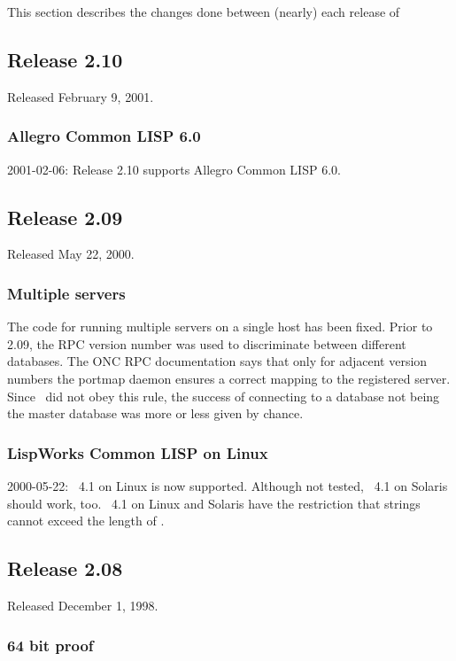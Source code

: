This section describes the changes done between (nearly) each release
of \plob

\subsection{Release 2.10}

Released February 9, 2001.

\subsubsection{Allegro Common LISP 6.0}

2001-02-06: Release 2.10 supports Allegro Common LISP 6.0.

\subsection{Release 2.09}

Released May 22, 2000.

\subsubsection{Multiple servers}

The code for running multiple servers on a single host has been fixed.
Prior to 2.09, the RPC version number was used to discriminate between
different databases. The ONC RPC documentation says that only for
adjacent version numbers the portmap daemon ensures a correct mapping
to the registered server. Since \plob\ did not obey this rule, the
success of connecting to a database not being the master database
was more or less given by chance.

\subsubsection{LispWorks Common LISP on Linux}

2000-05-22: \lwcl\ 4.1 on Linux is now supported. Although not tested,
\lwcl\ 4.1 on Solaris should work, too. \lwcl\ 4.1 on Linux and
Solaris have the restriction that strings cannot exceed the length of
.

\subsection{Release 2.08}

Released December 1, 1998.

\subsubsection{64 bit proof}

